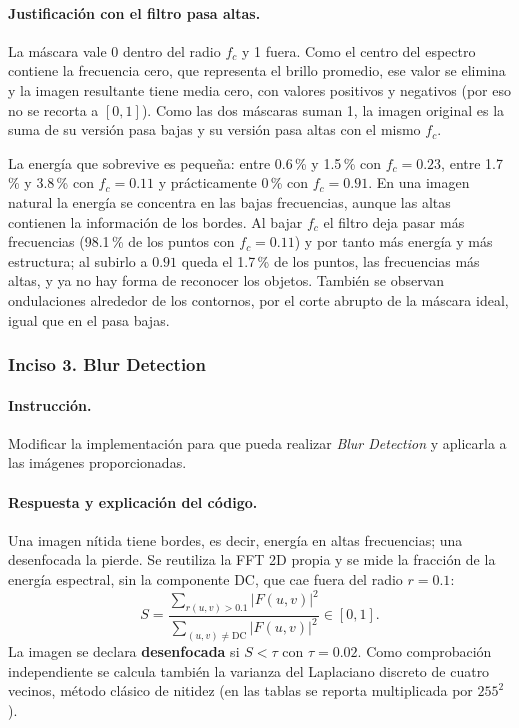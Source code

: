 \documentclass[11pt]{article}
\begin{document}
\paragraph{Justificación con el filtro pasa altas.}
La máscara vale 0 dentro del radio $f_c$ y 1 fuera. Como el centro del espectro contiene la frecuencia cero, que representa
el brillo promedio, ese valor se elimina y la imagen resultante tiene media cero, con valores positivos y negativos (por eso
no se recorta a $[0,1]$). Como las dos máscaras suman 1, la imagen original es la suma de su versión pasa bajas y su versión
pasa altas con el mismo $f_c$.

La energía que sobrevive es pequeña: entre 0.6\,\% y 1.5\,\% con $f_c=0.23$, entre 1.7\,\% y 3.8\,\% con $f_c=0.11$ y prácticamente
0\,\% con $f_c=0.91$. En una imagen natural la energía se concentra en las bajas frecuencias, aunque las altas contienen la
información de los bordes. Al bajar $f_c$ el filtro deja pasar más frecuencias (98.1\,\% de los puntos con $f_c=0.11$) y por
tanto más energía y más estructura; al subirlo a $0.91$ queda el 1.7\,\% de los puntos, las frecuencias más altas, y ya no hay
forma de reconocer los objetos. También se observan ondulaciones alrededor de los contornos, por el corte abrupto de la
máscara ideal, igual que en el pasa bajas.



\FloatBarrier
\subsubsection*{Inciso 3. Blur Detection}

\paragraph{Instrucción.}
Modificar la implementación para que pueda realizar \textit{Blur Detection} y aplicarla a las imágenes proporcionadas.

\paragraph{Respuesta y explicación del código.}
Una imagen nítida tiene bordes, es decir, energía en altas frecuencias; una desenfocada la pierde. Se reutiliza la FFT 2D propia
y se mide la fracción de la energía espectral, sin la componente DC, que cae fuera del radio $r=0.1$:
\begin{equation}
 S=\frac{\sum_{r(u,v)>0.1}|F(u,v)|^2}{\sum_{(u,v)\ne\mathrm{DC}}|F(u,v)|^2}\in[0,1].
\end{equation}
La imagen se declara \textbf{desenfocada} si $S<\tau$ con $\tau=0.02$. Como comprobación independiente se calcula también la
varianza del Laplaciano discreto de cuatro vecinos, método clásico de nitidez (en las tablas se reporta multiplicada por
$255^2$).
\end{document}
